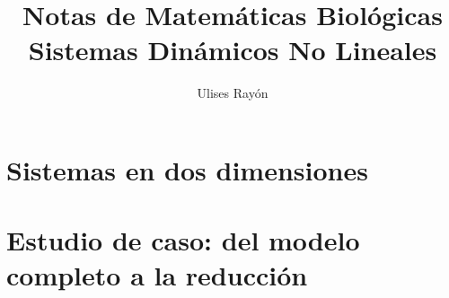 \documentclass[11pt,a4paper]{article}
\title{Notas de Matemáticas Biológicas\\[4pt]
       \large Sistemas Dinámicos No Lineales}
\author{Ulises Rayón}
\date{}
\begin{document}
\maketitle
\tableofcontents


















\part{Sistemas en dos dimensiones}






\part{Estudio de caso: del modelo completo a la reducción}



\printbibliography[heading=bibintoc, title={Referencias}]
\end{document}
